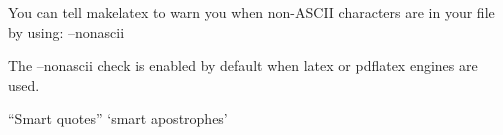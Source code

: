 \documentclass[letterpaper,12pt]{article}
\begin{document}
You can tell makelatex to warn you when non-ASCII characters are in your file by using: --nonascii

The --nonascii check is enabled by default when latex or pdflatex engines are used.

“Smart quotes”  ‘smart apostrophes’
\end{document}
